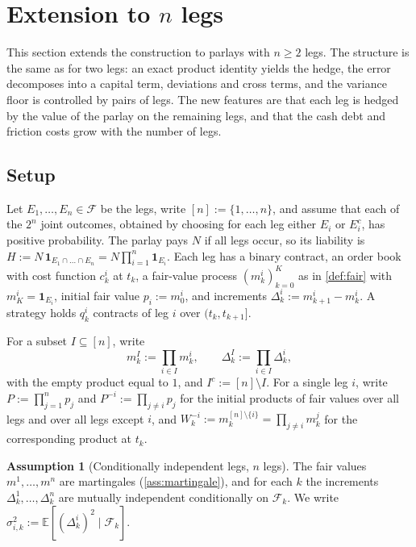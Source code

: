 \documentclass[11pt,a4paper]{article}
\theoremstyle{plain}
\theoremstyle{definition}
\newtheorem{assumption}[theorem]{Assumption}
\theoremstyle{remark}
\newcommand{\E}{\mathbb{E}}
\newcommand{\1}{\mathbf{1}}
\newcommand{\F}{\mathcal{F}}
\begin{document}
\section{Extension to \texorpdfstring{$n$}{n} legs}
\label{sec:nlegs}
This section extends the construction to parlays with $n\geq 2$ legs. The structure is the same as for two legs: an exact product identity yields the hedge, the error decomposes into a capital term, deviations and cross terms, and the variance floor is controlled by pairs of legs. The new features are that each leg is hedged by the value of the parlay on the remaining legs, and that the cash debt and friction costs grow with the number of legs.

\subsection{Setup}

Let $E_1,\dots,E_n\in\F$ be the legs, write $[n] := \{1,\dots,n\}$, and assume that each of the $2^n$ joint outcomes, obtained by choosing for each leg either $E_i$ or $E_i^c$, has positive probability. The parlay pays $N$ if all legs occur, so its liability is $H := N\,\1_{E_1\cap\dots\cap E_n} = N\prod_{i=1}^n\1_{E_i}$. Each leg has a binary contract, an order book with cost function $c^i_k$ at $t_k$, a fair-value process $(m^i_k)_{k=0}^K$ as in \cref{def:fair} with $m^i_K = \1_{E_i}$, initial fair value $p_i := m^i_0$, and increments $\Delta^i_k := m^i_{k+1}-m^i_k$. A strategy holds $q^i_k$ contracts of leg $i$ over $(t_k,t_{k+1}]$.

For a subset $I\subseteq[n]$, write
\[
m^I_k := \prod_{i\in I}m^i_k,\qquad \Delta^I_k := \prod_{i\in I}\Delta^i_k,
\]
with the empty product equal to $1$, and $I^c := [n]\setminus I$. For a single leg $i$, write $P := \prod_{j=1}^n p_j$ and $P^{-i} := \prod_{j\neq i}p_j$ for the initial products of fair values over all legs and over all legs except $i$, and $W^{-i}_k := m^{[n]\setminus\{i\}}_k = \prod_{j\neq i}m^j_k$ for the corresponding product at $t_k$.

\begin{assumption}[Conditionally independent legs, $n$ legs]
\label{ass:independence-n}
The fair values $m^1,\dots,m^n$ are martingales (\cref{ass:martingale}), and for each $k$ the increments $\Delta^1_k,\dots,\Delta^n_k$ are mutually independent conditionally on $\F_k$. We write $\sigma^2_{i,k} := \E[(\Delta^i_k)^2\mid\F_k]$.
\end{assumption}
\end{document}
